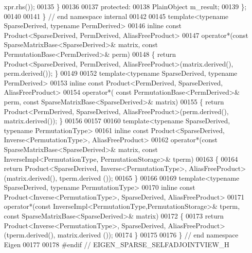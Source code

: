 \begin{DoxyCode}
      xpr.rhs());
00135   \}
00136 
00137 protected:
00138   PlainObject m\_result;
00139 \};
00140 
00141 \} \textcolor{comment}{// end namespace internal}
00142 
00145 template<typename SparseDerived, typename PermDerived>
00146 inline const Product<SparseDerived, PermDerived, AliasFreeProduct>
00147 operator*(const SparseMatrixBase<SparseDerived>& matrix, const PermutationBase<PermDerived>& perm)
00148 \{ \textcolor{keywordflow}{return} Product<SparseDerived, PermDerived, AliasFreeProduct>(matrix.derived(), perm.derived()); \}
00149 
00152 \textcolor{keyword}{template}<\textcolor{keyword}{typename} SparseDerived, \textcolor{keyword}{typename} PermDerived>
00153 \textcolor{keyword}{inline} \textcolor{keyword}{const} Product<PermDerived, SparseDerived, AliasFreeProduct>
00154 operator*( \textcolor{keyword}{const} PermutationBase<PermDerived>& perm, \textcolor{keyword}{const} SparseMatrixBase<SparseDerived>& matrix)
00155 \{ \textcolor{keywordflow}{return}  Product<PermDerived, SparseDerived, AliasFreeProduct>(perm.derived(), matrix.derived()); \}
00156 
00157 
00160 \textcolor{keyword}{template}<\textcolor{keyword}{typename} SparseDerived, \textcolor{keyword}{typename} PermutationType>
00161 \textcolor{keyword}{inline} \textcolor{keyword}{const} Product<SparseDerived, Inverse<PermutationType>, AliasFreeProduct>
00162 operator*(\textcolor{keyword}{const} SparseMatrixBase<SparseDerived>& matrix, \textcolor{keyword}{const} InverseImpl<PermutationType,
       PermutationStorage>& tperm)
00163 \{
00164   \textcolor{keywordflow}{return} Product<SparseDerived, Inverse<PermutationType>, AliasFreeProduct>(matrix.derived(), tperm.derived
      ());
00165 \}
00166 
00169 \textcolor{keyword}{template}<\textcolor{keyword}{typename} SparseDerived, \textcolor{keyword}{typename} PermutationType>
00170 \textcolor{keyword}{inline} \textcolor{keyword}{const} Product<Inverse<PermutationType>, SparseDerived, AliasFreeProduct>
00171 operator*(\textcolor{keyword}{const} InverseImpl<PermutationType,PermutationStorage>& tperm, \textcolor{keyword}{const} 
      SparseMatrixBase<SparseDerived>& matrix)
00172 \{
00173   \textcolor{keywordflow}{return} Product<Inverse<PermutationType>, SparseDerived, AliasFreeProduct>(tperm.derived(), matrix.derived
      ());
00174 \}
00175 
00176 \} \textcolor{comment}{// end namespace Eigen}
00177 
00178 \textcolor{preprocessor}{#endif // EIGEN\_SPARSE\_SELFADJOINTVIEW\_H}
\end{DoxyCode}
